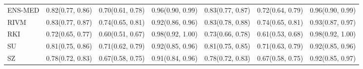 \begin{tabular}{l p{} p{} p{} p{} p{} p{}}
ENS-MED & {0.82\newline(0.77, 0.86)} & {0.70\newline(0.61, 0.78)} & {0.96\newline(0.90, 0.99)} & {0.83\newline(0.77, 0.87)} & {0.72\newline(0.64, 0.79)} & {0.96\newline(0.90, 0.99)} \\
RIVM & {0.83\newline(0.77, 0.87)} & {0.74\newline(0.65, 0.81)} & {0.92\newline(0.86, 0.96)} & {0.83\newline(0.78, 0.88)} & {0.74\newline(0.65, 0.81)} & {0.93\newline(0.87, 0.97)} \\
RKI & {0.72\newline(0.65, 0.77)} & {0.60\newline(0.51, 0.67)} & {0.98\newline(0.92, 1.00)} & {0.73\newline(0.66, 0.78)} & {0.61\newline(0.53, 0.68)} & {0.98\newline(0.92, 1.00)} \\
SU & {0.81\newline(0.75, 0.86)} & {0.71\newline(0.62, 0.79)} & {0.92\newline(0.85, 0.96)} & {0.81\newline(0.75, 0.85)} & {0.71\newline(0.63, 0.79)} & {0.92\newline(0.85, 0.96)} \\
SZ & {0.78\newline(0.72, 0.83)} & {0.67\newline(0.58, 0.75)} & {0.91\newline(0.84, 0.96)} & {0.78\newline(0.72, 0.83)} & {0.67\newline(0.58, 0.75)} & {0.92\newline(0.85, 0.97)} \\
\bottomrule
\end{tabular}
